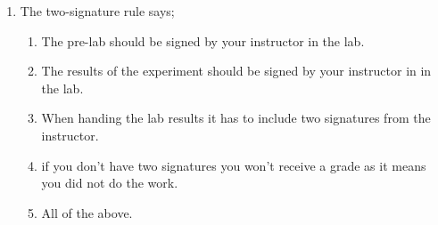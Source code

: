 \documentclass[cover.tex]{subfiles}
\begin{document}
\begin{refsection}
\begin{multicols*}{2}
\begin{enumerate}
\item The two-signature rule says;
\begin{enumerate}[label=(\alph*)]
\item The pre-lab should be signed by your instructor in the lab.
\item The results of the experiment should be signed by your instructor in in the lab.
\item When handing the lab  results it has to include two signatures from the instructor.
\item if you don't have two signatures you won't receive a grade as it means you did not do the work.
\item All of the above.
\end{enumerate}
\end{enumerate}



\end{multicols*}

 \end{refsection}
  \clearpage\mbox{}\clearpage
\end{document}
